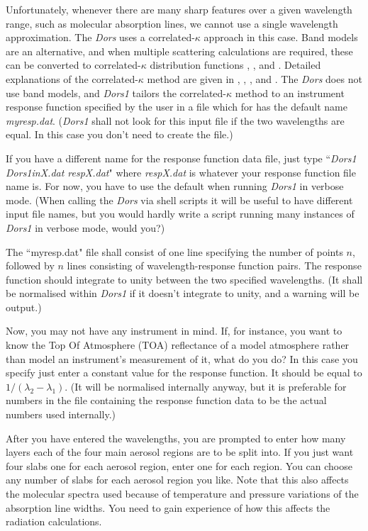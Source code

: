 \documentclass[12pt]{article}
\begin{document}
Unfortunately, whenever there are many sharp features over a given wavelength
range, such as molecular absorption lines, we cannot use a single wavelength approximation.
The {\it Dors} uses a correlated-$\kappa$ approach in this case. Band models are an alternative,
and when multiple scattering calculations are required, these can be converted
to correlated-$\kappa$ distribution functions \cite{Goody:Mybib}, \cite{Domoto:Mybib}, and
 \cite{GodsalveBand:Mybib}.
Detailed explanations of the correlated-$\kappa$ method are given in \cite{GoodyWest:Mybib}, 
\cite{LacisOinas:Mybib}, \cite{FuLiou:Mybib}, and \cite{RoseKratz:Mybib}. The {\it Dors} does not use
band models, and {\it Dors1} tailors the correlated-$\kappa$ method to an instrument response
function specified by the user in a file which for has the default name {\it myresp.dat}.
 ({\it Dors1} shall not look for this input file if the two wavelengths
are equal. In this case you don't need to create the file.)

If you have a different name for the response function data file, just 
type ``{\it Dors1 Dors1inX.dat respX.dat}" where {\it respX.dat} is whatever
your response function file name is. For now, you have to use the default when running {\it Dors1} in verbose
mode. (When calling the {\it Dors} via shell scripts it will be useful to have different input file names,
 but you would hardly write a script  running  many instances of {\it Dors1} in verbose mode, would you?)

 The ``myresp.dat"  file  shall
consist of one line specifying the number of points $n$,
 followed by $n$ lines consisting
of wavelength-response function pairs. The response function should integrate to unity
between the two specified wavelengths. (It shall be normalised within {\it Dors1} if
it doesn't integrate to unity, and a warning will be output.)

Now, you may not have any instrument in mind. If, for instance, you want to know the Top Of Atmosphere (TOA) 
reflectance of a model atmosphere rather than model an instrument's measurement of it, what do you do?
In this case you specify just enter a constant value for the response function. It should be equal
to $1/(\lambda_2-\lambda_1)$. (It will be normalised internally anyway, but
it is preferable for numbers in the file containing the response function data to be the
actual numbers used internally.)

After you have entered the wavelengths, you are prompted to enter how many layers each of
the four main aerosol regions are to be split into. If you just want four slabs one for
each aerosol region, enter one for each region. You can choose any number of slabs for
each aerosol region you like. Note that this also affects the molecular spectra used
because of temperature and pressure variations of the absorption line widths. You need to
gain experience of how this affects the radiation calculations.
\end{document}
